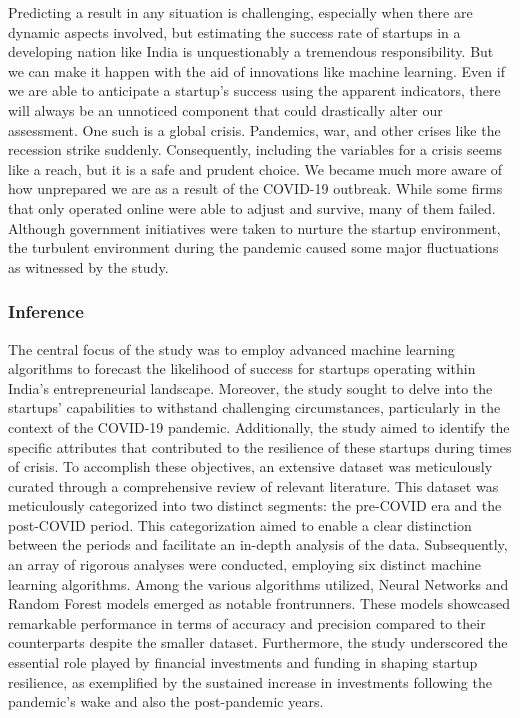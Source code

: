 \documentclass[12pt]{article}
\begin{document}
Predicting a result in any situation is challenging, especially when there are dynamic aspects involved, but estimating the success rate of startups in a developing nation like India is unquestionably a tremendous responsibility. But we can make it happen with the aid of innovations like machine learning. Even if we are able to anticipate a startup's success using the apparent indicators, there will always be an unnoticed component that could drastically alter our assessment. One such is a global crisis. Pandemics, war, and other crises like the recession strike suddenly. Consequently, including the variables for a crisis seems like a reach, but it is a safe and prudent choice. We became much more aware of how unprepared we are as a result of the COVID-19 outbreak. While some firms that only operated online were able to adjust and survive, many of them failed. Although government initiatives were taken to nurture the startup environment, the turbulent environment during the pandemic caused some major fluctuations as witnessed by the study.

\subsubsection{Inference}

The central focus of the study was to employ advanced machine learning algorithms to forecast the likelihood of success for startups operating within India's entrepreneurial landscape. Moreover, the study sought to delve into the startups' capabilities to withstand challenging circumstances, particularly in the context of the COVID-19 pandemic. Additionally, the study aimed to identify the specific attributes that contributed to the resilience of these startups during times of crisis. To accomplish these objectives, an extensive dataset was meticulously curated through a comprehensive review of relevant literature. This dataset was meticulously categorized into two distinct segments: the pre-COVID era and the post-COVID period. This categorization aimed to enable a clear distinction between the periods and facilitate an in-depth analysis of the data. Subsequently, an array of rigorous analyses were conducted, employing six distinct machine learning algorithms. Among the various algorithms utilized, Neural Networks and Random Forest models emerged as notable frontrunners. These models showcased remarkable performance in terms of accuracy and precision compared to their counterparts despite the smaller dataset. Furthermore, the study underscored the essential role played by financial investments and funding in shaping startup resilience, as exemplified by the sustained increase in investments following the pandemic's wake and also the post-pandemic years.
\end{document}
